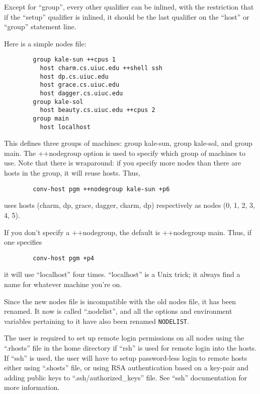 \begin{itemize}
Except for ``group'', every other qualifier can be inlined, with the
restriction that if the ``setup'' qualifier is inlined, it should be
the last qualifier on the ``host'' or ``group'' statement line.

Here is a simple nodes file:

\begin{verbatim}
        group kale-sun ++cpus 1
          host charm.cs.uiuc.edu ++shell ssh
          host dp.cs.uiuc.edu
          host grace.cs.uiuc.edu
          host dagger.cs.uiuc.edu
        group kale-sol
          host beauty.cs.uiuc.edu ++cpus 2
        group main
          host localhost
\end{verbatim}

This defines three groups of machines: group kale-sun, group kale-sol,
and group main.  The ++nodegroup option is used to specify which group
of machines to use.  Note that there is wraparound: if you specify
more nodes than there are hosts in the group, it will reuse
hosts. Thus,

\begin{verbatim}
        conv-host pgm ++nodegroup kale-sun +p6
\end{verbatim}

uses hosts (charm, dp, grace, dagger, charm, dp) respectively as
nodes (0, 1, 2, 3, 4, 5).

If you don't specify a ++nodegroup, the default is ++nodegroup main.
Thus, if one specifies

\begin{verbatim}
        conv-host pgm +p4
\end{verbatim}

it will use ``localhost'' four times.  ``localhost'' is a Unix
trick; it always find a name for whatever machine you're on.

Since the new nodes file is incompatible with the old nodes file, it has
been renamed.  It now is called ``.nodelist'', and all the options and
environment variables pertaining to it have also been renamed {\tt NODELIST}.

The user is required to set up remote login permissions on all nodes
using the ``.rhosts'' file in the home directory if ``rsh'' is used for remote
login into the hosts. If ``ssh'' is used, the user will have to setup
password-less login to remote hosts either using ``.shosts'' file, or using
RSA authentication based on a key-pair and adding public keys to ``.ssh/authorized\_keys'' file. See ``ssh'' documentation for more information.

\end{itemize}

